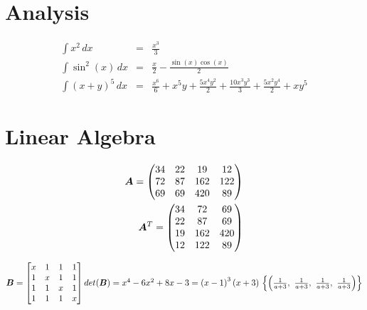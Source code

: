 \documentclass[12pt]{article}
\begin{document}
    \section{Analysis}\label{sec:analysis}

    \begin{align}
        \int x^{2}\, dx &=& \frac{x^{3}}{3} \\
        \int \sin^{2}{\left(x \right)}\, dx &=& \frac{x}{2} - \frac{\sin{\left(x \right)} \cos{\left(x \right)}}{2} \\
        \int \left(x + y\right)^{5}\, dx &=& \frac{x^{6}}{6} + x^{5} y + \frac{5 x^{4} y^{2}}{2} + \frac{10 x^{3} y^{3}}{3} + \frac{5 x^{2} y^{4}}{2} + x y^{5}
    \end{align}


    \section{Linear Algebra}\label{sec:linalg}

    \begin{align}
        {\bm{A}} = \left(\begin{matrix}
                        34 & 22 & 19 & 12\\72 & 87 & 162 & 122\\69 & 69 & 420 & 89
        \end{matrix}\right) \\
        {\bm{A}}^{T} = \left(\begin{matrix}
                            34 & 72 & 69\\22 & 87 & 69\\19 & 162 & 420\\12 & 122 & 89
        \end{matrix}\right)
    \end{align}

    \begin{math}
        {\bm{B}} = \left[\begin{matrix}
                        x & 1 & 1 & 1\\1 & x & 1 & 1\\1 & 1 & x & 1\\1 & 1 & 1 & x
        \end{matrix}\right] \\
        det({\bm{B}}) = x^{4} - 6 x^{2} + 8 x - 3 = \left(x - 1\right)^{3} \left(x + 3\right) \\
        \left\{\left( \frac{1}{a + 3}, \  \frac{1}{a + 3}, \  \frac{1}{a + 3}, \  \frac{1}{a + 3}\right)\right\}
    \end{math}
\end{document}
